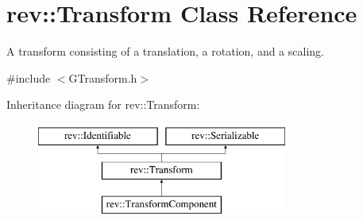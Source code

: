 \hypertarget{classrev_1_1_transform}{}\section{rev\+::Transform Class Reference}
\label{classrev_1_1_transform}


A transform consisting of a translation, a rotation, and a scaling.  




{\ttfamily \#include $<$G\+Transform.\+h$>$}

Inheritance diagram for rev\+::Transform\+:\begin{figure}[H]
\begin{center}
\leavevmode
\includegraphics[height=3.000000cm]{classrev_1_1_transform}
\end{center}
\end{figure}
